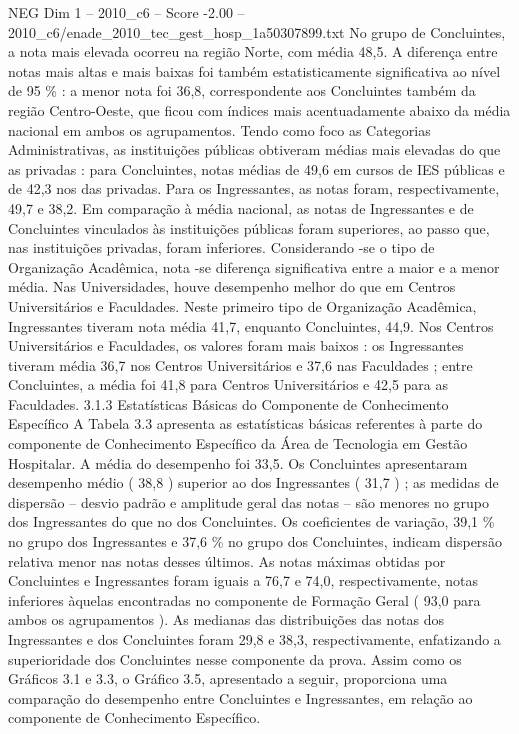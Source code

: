 \begin{textsample}{NEG Dim 1 – 2010\_c6 – Score -2.00 – 2010\_c6/enade\_2010\_tec\_gest\_hosp\_1a50307899.txt}
No grupo de Concluintes, a nota mais elevada ocorreu na região Norte, com média 48,5.
A diferença entre notas mais altas e mais baixas foi também estatisticamente significativa ao nível de 95 \% : a menor nota foi 36,8, correspondente aos Concluintes também da região Centro-Oeste, que ficou com índices mais acentuadamente abaixo da média nacional em ambos os agrupamentos.
Tendo como foco as Categorias Administrativas, as instituições públicas obtiveram médias mais elevadas do que as privadas : para Concluintes, notas médias de 49,6 em cursos de IES públicas e de 42,3 nos das privadas.
Para os Ingressantes, as notas foram, respectivamente, 49,7 e 38,2.
Em comparação à média nacional, as notas de Ingressantes e de Concluintes vinculados às instituições públicas foram superiores, ao passo que, nas instituições privadas, foram inferiores.
Considerando -se o tipo de Organização Acadêmica, nota -se diferença significativa entre a maior e a menor média.
Nas Universidades, houve desempenho melhor do que em Centros Universitários e Faculdades.
Neste primeiro tipo de Organização Acadêmica, Ingressantes tiveram nota média 41,7, enquanto Concluintes, 44,9.
Nos Centros Universitários e Faculdades, os valores foram mais baixos : os Ingressantes tiveram média 36,7 nos Centros Universitários e 37,6 nas Faculdades ; entre Concluintes, a média foi 41,8 para Centros Universitários e 42,5 para as Faculdades. 3.1.3 Estatísticas Básicas do Componente de Conhecimento Específico A Tabela 3.3 apresenta as estatísticas básicas referentes à parte do componente de Conhecimento Específico da Área de Tecnologia em Gestão Hospitalar.
A média do desempenho foi 33,5.
Os Concluintes apresentaram desempenho médio ( 38,8 ) superior ao dos Ingressantes ( 31,7 ) ; as medidas de dispersão – desvio padrão e amplitude geral das notas – são menores no grupo dos Ingressantes do que no dos Concluintes.
Os coeficientes de variação, 39,1 \% no grupo dos Ingressantes e 37,6 \% no grupo dos Concluintes, indicam dispersão relativa menor nas notas desses últimos.
As notas máximas obtidas por Concluintes e Ingressantes foram iguais a 76,7 e 74,0, respectivamente, notas inferiores àquelas encontradas no componente de Formação Geral ( 93,0 para ambos os agrupamentos ).
As medianas das distribuições das notas dos Ingressantes e dos Concluintes foram 29,8 e 38,3, respectivamente, enfatizando a superioridade dos Concluintes nesse componente da prova.
Assim como os Gráficos 3.1 e 3.3, o Gráfico 3.5, apresentado a seguir, proporciona uma comparação do desempenho entre Concluintes e Ingressantes, em relação ao componente de Conhecimento Específico.

\end{textsample}
